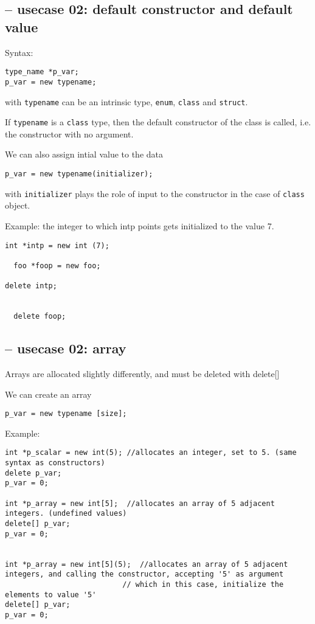 \subsection{-- usecase 02: default constructor and default value}

Syntax:
\begin{verbatim}
type_name *p_var;
p_var = new typename;
\end{verbatim}
with \verb!typename! can be an intrinsic type, \verb!enum!, \verb!class! and
\verb!struct!. 

If \verb!typename! is a \verb!class! type, then the default constructor of the
class is called, i.e. the constructor with no argument.


We can also assign intial value to the data
\begin{verbatim}
p_var = new typename(initializer);
\end{verbatim}
with \verb!initializer! plays the role of input to the constructor in the case
of \verb!class! object.

Example: the integer to which intp points gets initialized to the value 7. 
\begin{verbatim}
int *intp = new int (7);

  foo *foop = new foo;

delete intp;
  
  
  delete foop;

\end{verbatim}

\subsection{-- usecase 02: array}

Arrays are allocated slightly differently, and must be deleted with delete[]


We can create an array
\begin{verbatim}
p_var = new typename [size];
\end{verbatim}

Example:
{\small 
\begin{verbatim}
int *p_scalar = new int(5); //allocates an integer, set to 5. (same syntax as constructors)
delete p_var;
p_var = 0;

int *p_array = new int[5];  //allocates an array of 5 adjacent integers. (undefined values)
delete[] p_var;
p_var = 0;


int *p_array = new int[5](5);  //allocates an array of 5 adjacent integers, and calling the constructor, accepting '5' as argument
                           // which in this case, initialize the elements to value '5'
delete[] p_var;
p_var = 0;

\end{verbatim}}


